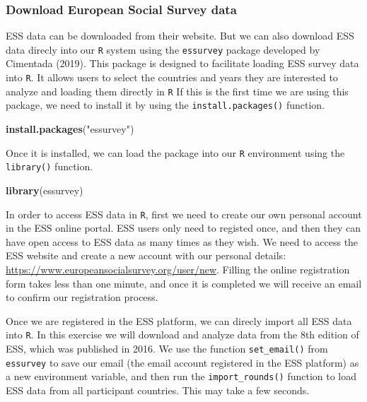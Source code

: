 \documentclass[
]{article}
\newenvironment{Shaded}{\begin{snugshade}}{\end{snugshade}}
\newcommand{\KeywordTok}[1]{\textcolor[rgb]{0.13,0.29,0.53}{\textbf{#1}}}
\newcommand{\NormalTok}[1]{#1}
\newcommand{\StringTok}[1]{\textcolor[rgb]{0.31,0.60,0.02}{#1}}
\begin{document}
\hypertarget{download-european-social-survey-data}{%
\subsubsection{Download European Social Survey
data}\label{download-european-social-survey-data}}

ESS data can be downloaded from their website. But we can also download
ESS data direcly into our \texttt{R} system using the \texttt{essurvey}
package developed by Cimentada (2019). This package is designed to
facilitate loading ESS survey data into \texttt{R}. It allows users to
select the countries and years they are interested to analyze and
loading them directly in \texttt{R} If this is the first time we are
using this package, we need to install it by using the
\texttt{install.packages()} function.

\begin{Shaded}
\begin{Highlighting}[]
\KeywordTok{install.packages}\NormalTok{(}\StringTok{"essurvey"}\NormalTok{) }
\end{Highlighting}
\end{Shaded}

Once it is installed, we can load the package into our \texttt{R}
environment using the \texttt{library()} function.

\begin{Shaded}
\begin{Highlighting}[]
\KeywordTok{library}\NormalTok{(essurvey)}
\end{Highlighting}
\end{Shaded}

In order to access ESS data in \texttt{R}, first we need to create our
own personal account in the ESS online portal. ESS users only need to
registed once, and then they can have open access to ESS data as many
times as they wish. We need to access the ESS website and create a new
account with our personal details:
\url{https://www.europeansocialsurvey.org/user/new}. Filling the online
registration form takes less than one minute, and once it is completed
we will receive an email to confirm our registration process.

Once we are registered in the ESS platform, we can direcly import all
ESS data into \texttt{R}. In this exercise we will download and analyze
data from the 8th edition of ESS, which was published in 2016. We use
the function \texttt{set\_email()} from \texttt{essurvey} to save our
email (the email account registered in the ESS platform) as a new
environment variable, and then run the \texttt{import\_rounds()}
function to load ESS data from all participant countries. This may take
a few seconds.
\end{document}
